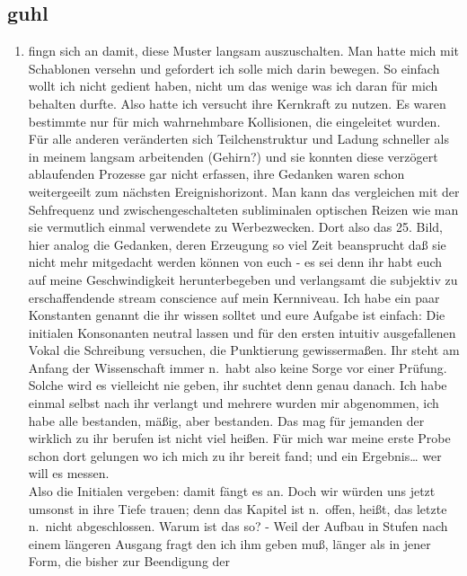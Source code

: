 \documentclass[
]{article}
\author{}
\date{\vspace{-2.5em}}
\providecommand{\tightlist}{%
  \setlength{\itemsep}{0pt}\setlength{\parskip}{0pt}}
\begin{document}
\subsection{guhl}\label{guhl}

\begin{enumerate}
\def\labelenumi{\arabic{enumi}.}
\setcounter{enumi}{1}
\tightlist
\item
  fingn sich an damit, diese Muster langsam auszuschalten. Man hatte
  mich mit Schablonen versehn und gefordert ich solle mich darin
  bewegen. So einfach wollt ich nicht gedient haben, nicht um das wenige
  was ich daran für mich behalten durfte. Also hatte ich versucht ihre
  Kernkraft zu nutzen. Es waren bestimmte nur für mich wahrnehmbare
  Kollisionen, die eingeleitet wurden. Für alle anderen veränderten sich
  Teilchenstruktur und Ladung schneller als in meinem langsam
  arbeitenden (Gehirn?) und sie konnten diese verzögert ablaufenden
  Prozesse gar nicht erfassen, ihre Gedanken waren schon weitergeeilt
  zum nächsten Ereignishorizont. Man kann das vergleichen mit der
  Sehfrequenz und zwischengeschalteten subliminalen optischen Reizen wie
  man sie vermutlich einmal verwendete zu Werbezwecken. Dort also das
  25. Bild, hier analog die Gedanken, deren Erzeugung so viel Zeit
  beansprucht daß sie nicht mehr mitgedacht werden können von euch - es
  sei denn ihr habt euch auf meine Geschwindigkeit herunterbegeben und
  verlangsamt die subjektiv zu erschaffendende stream conscience auf
  mein Kernniveau. Ich habe ein paar Konstanten genannt die ihr wissen
  solltet und eure Aufgabe ist einfach: Die initialen Konsonanten
  neutral lassen und für den ersten intuitiv ausgefallenen Vokal die
  Schreibung versuchen, die Punktierung gewissermaßen. Ihr steht am
  Anfang der Wissenschaft immer n.~habt also keine Sorge vor einer
  Prüfung. Solche wird es vielleicht nie geben, ihr suchtet denn genau
  danach. Ich habe einmal selbst nach ihr verlangt und mehrere wurden
  mir abgenommen, ich habe alle bestanden, mäßig, aber bestanden. Das
  mag für jemanden der wirklich zu ihr berufen ist nicht viel heißen.
  Für mich war meine erste Probe schon dort gelungen wo ich mich zu ihr
  bereit fand; und ein Ergebnis\ldots{} wer will es messen.\\
  Also die Initialen vergeben: damit fängt es an. Doch wir würden uns
  jetzt umsonst in ihre Tiefe trauen; denn das Kapitel ist n.~offen,
  heißt, das letzte n.~nicht abgeschlossen. Warum ist das so? - Weil der
  Aufbau in Stufen nach einem längeren Ausgang fragt den ich ihm geben
  muß, länger als in jener Form, die bisher zur Beendigung der

\end{enumerate}
\end{document}
